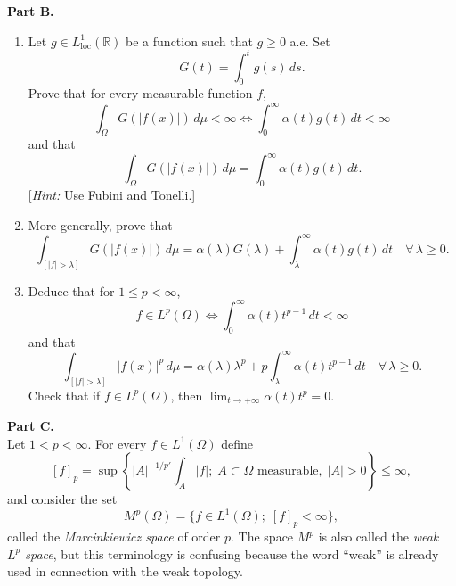 \documentclass[12pt]{article}
\newcommand{\abs}[1]{\left|#1\right|}
\newcommand{\R}{\mathbb{R}}
\begin{document}
\noindent\textbf{Part B.}
 
\begin{enumerate}
\item Let $g \in L^1_{\mathrm{loc}}(\R)$ be a function such that $g \ge 0$ a.e. Set
\[
G(t) = \int_0^t g(s)\,ds.
\]
Prove that for every measurable function $f$,
\[
\int_\Omega G(\abs{f(x)})\,d\mu < \infty \iff \int_0^\infty \alpha(t)g(t)\,dt < \infty
\]
and that
\[
\int_\Omega G(\abs{f(x)})\,d\mu = \int_0^\infty \alpha(t)g(t)\,dt.
\]
[\textit{Hint:} Use Fubini and Tonelli.]
 
\item More generally, prove that
\[
\int_{[\abs{f}>\lambda]} G(\abs{f(x)})\,d\mu = \alpha(\lambda)G(\lambda) + \int_\lambda^\infty \alpha(t)g(t)\,dt
\quad \forall\, \lambda \ge 0.
\]
 
\item Deduce that for $1 \le p < \infty$,
\[
f \in L^p(\Omega) \iff \int_0^\infty \alpha(t)t^{p-1}\,dt < \infty
\]
and that
\[
\int_{[\abs{f}>\lambda]} \abs{f(x)}^p\,d\mu = \alpha(\lambda)\lambda^p + p\int_\lambda^\infty \alpha(t)t^{p-1}\,dt
\quad \forall\, \lambda \ge 0.
\]
Check that if $f \in L^p(\Omega)$, then $\lim_{t\to+\infty}\alpha(t)t^p = 0$.
\end{enumerate}
 
\noindent\textbf{Part C.}\\
Let $1 < p < \infty$. For every $f \in L^1(\Omega)$ define
\[
[f]_p = \sup\left\{\abs{A}^{-1/p'}\int_A \abs{f};\; A \subset \Omega \text{ measurable},\; \abs{A} > 0\right\} \le \infty,
\]
and consider the set
\[
M^p(\Omega) = \{f \in L^1(\Omega);\; [f]_p < \infty\},
\]
called the \emph{Marcinkiewicz space} of order $p$. The space $M^p$ is also called the \emph{weak $L^p$
space}, but this terminology is confusing because the word ``weak'' is already used in
connection with the weak topology.
 
\end{document}
